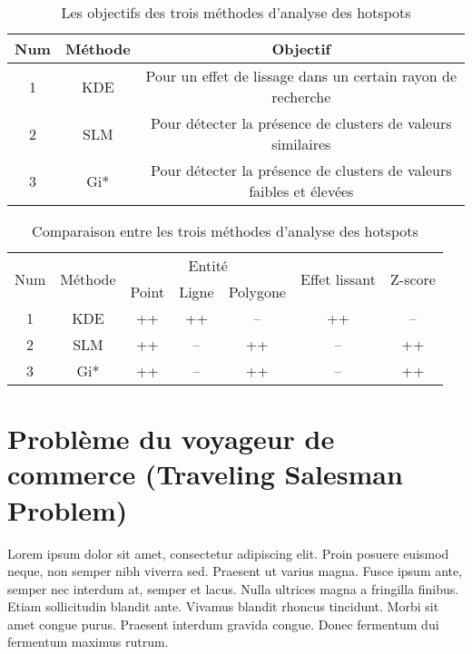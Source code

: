 \begin{table}[h!]
  \centering
  \begin{tabular}{|c|c|c|}
    \hline
    Num & Méthode & Objectif                                                            \\
    \hline
    1   & KDE     & Pour un effet de lissage dans un certain rayon de recherche         \\
    \hline
    2   & SLM     & Pour détecter la présence de clusters de valeurs similaires         \\
    \hline
    3   & Gi*     & Pour détecter la présence de clusters de valeurs faibles et élevées \\
    \hline
  \end{tabular}
  \caption{Les objectifs des trois méthodes d'analyse des hotspots}
  \label{tab:hotspot-analysis-comparison-1}
\end{table}
\FloatBarrier

\medskip

\begin{table}[h!]
  \centering
  \begin{tabular}{|c|c|c|c|c|c|c|}
    \hline
    \multirow{2}{*}{Num} & \multirow{2}{*}{Méthode} & \multicolumn{3}{c|}{Entité} & \multirow{2}{*}{Effet lissant} & \multirow{2}{*}{Z-score}           \\
    \cline{3-5}
                         &                          & Point                       & Ligne                          & Polygone                 &    &    \\
    \hline
    1                    & KDE                      & ++                          & ++                             & --                       & ++ & -- \\
    \hline
    2                    & SLM                      & ++                          & --                             & ++                       & -- & ++ \\
    \hline
    3                    & Gi*                      & ++                          & --                             & ++                       & -- & ++ \\
    \hline
  \end{tabular}
  \caption{Comparaison entre les trois méthodes d'analyse des hotspots}
  \label{tab:hotspot-analysis-comparison-2}
\end{table}
\FloatBarrier

\section{Problème du voyageur de commerce (Traveling Salesman Problem)}
Lorem ipsum dolor sit amet, consectetur adipiscing elit. Proin posuere euismod neque, non semper nibh viverra sed. Praesent ut varius magna. Fusce ipsum ante, semper nec interdum at, semper et lacus. Nulla ultrices magna a fringilla finibus. Etiam sollicitudin blandit ante. Vivamus blandit rhoncus tincidunt. Morbi sit amet congue purus. Praesent interdum gravida congue. Donec fermentum dui fermentum maximus rutrum.

